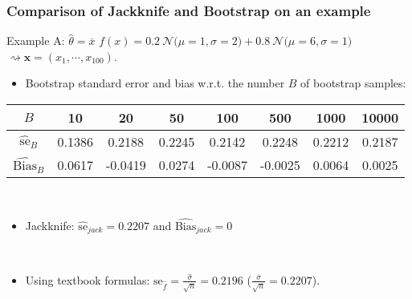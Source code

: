 {
\frametitle{Comparison of Jackknife and Bootstrap on an example}
\begin{exampleblock}{Example A: $\hat{\theta}=\overline{x}$}
 $f(x)=0.2\ \mathcal{N}(\scriptstyle \mu=1,\sigma=2 \displaystyle) +0.8\  \mathcal{N}( \scriptstyle\mu=6,\sigma=1 \displaystyle)
$   $\rightsquigarrow\mathbf{x}=(x_1,\cdots,x_{100})$. 
\begin{itemize}
\item  Bootstrap standard error and bias w.r.t. the number $B$ of bootstrap samples: 
\end{itemize}
\begin{tabular}{|c|c|c|c|c|c|c|c|}
\hline
$B$& 10& 20 & 50 & 100 & 500 & 1000  & 10000\\
\hline
$\widehat{\mathrm{se}}_{B}$& \small{0.1386} & \small{0.2188} & \small{0.2245} & \small{0.2142} & \small{0.2248}& \small{0.2212} & \small{0.2187}\\
\hline
$\widehat{\mathrm{Bias}}_{B}$ & \small{0.0617} & \small{-0.0419} & \small{0.0274} & \small{-0.0087} & \small{-0.0025} &  \small{0.0064} & \small{0.0025} \\
\hline
\end{tabular}

\

\begin{itemize}
\item Jackknife: $\widehat{\mathrm{se}}_{jack}=0.2207$ and  $\widehat{\mathrm{Bias}}_{jack}= 0$

\

\item Using textbook formulas:  $ \mathrm{se}_{\hat{f}}=\frac{\hat{\sigma}}{\sqrt{n}}=0.2196$  ($\frac{\overline{\sigma}}{\sqrt{n}}=0.2207$).
\end{itemize}
\end{exampleblock}

}

